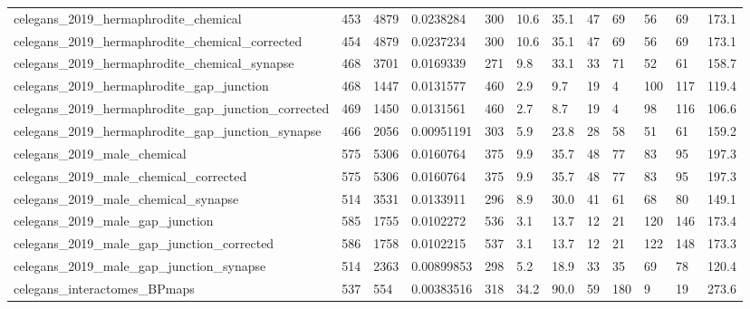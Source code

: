 \begin{longtable}{llllllllllll}
 celegans\_2019\_hermaphrodite\_chemical               & 453        & 4879      & 0.0238284   & 300   & 10.6   & 35.1   & 47    & 69     & 56     & 69     & 173.1   \\
 celegans\_2019\_hermaphrodite\_chemical\_corrected     & 454        & 4879      & 0.0237234   & 300   & 10.6   & 35.1   & 47    & 69     & 56     & 69     & 173.1   \\
 celegans\_2019\_hermaphrodite\_chemical\_synapse       & 468        & 3701      & 0.0169339   & 271   & 9.8    & 33.1   & 33    & 71     & 52     & 61     & 158.7   \\
 celegans\_2019\_hermaphrodite\_gap\_junction           & 468        & 1447      & 0.0131577   & 460   & 2.9    & 9.7    & 19    & 4      & 100    & 117    & 119.4   \\
 celegans\_2019\_hermaphrodite\_gap\_junction\_corrected & 469        & 1450      & 0.0131561   & 460   & 2.7    & 8.7    & 19    & 4      & 98     & 116    & 106.6   \\
 celegans\_2019\_hermaphrodite\_gap\_junction\_synapse   & 466        & 2056      & 0.00951191  & 303   & 5.9    & 23.8   & 28    & 58     & 51     & 61     & 159.2   \\
 celegans\_2019\_male\_chemical                        & 575        & 5306      & 0.0160764   & 375   & 9.9    & 35.7   & 48    & 77     & 83     & 95     & 197.3   \\
 celegans\_2019\_male\_chemical\_corrected              & 575        & 5306      & 0.0160764   & 375   & 9.9    & 35.7   & 48    & 77     & 83     & 95     & 197.3   \\
 celegans\_2019\_male\_chemical\_synapse                & 514        & 3531      & 0.0133911   & 296   & 8.9    & 30.0   & 41    & 61     & 68     & 80     & 149.1   \\
 celegans\_2019\_male\_gap\_junction                    & 585        & 1755      & 0.0102272   & 536   & 3.1    & 13.7   & 12    & 21     & 120    & 146    & 173.4   \\
 celegans\_2019\_male\_gap\_junction\_corrected          & 586        & 1758      & 0.0102215   & 537   & 3.1    & 13.7   & 12    & 21     & 122    & 148    & 173.3   \\
 celegans\_2019\_male\_gap\_junction\_synapse            & 514        & 2363      & 0.00899853  & 298   & 5.2    & 18.9   & 33    & 35     & 69     & 78     & 120.4   \\
 celegans\_interactomes\_BPmaps                       & 537        & 554       & 0.00383516  & 318   & 34.2   & 90.0   & 59    & 180    & 9      & 19     & 273.6   \\

\end{longtable}

